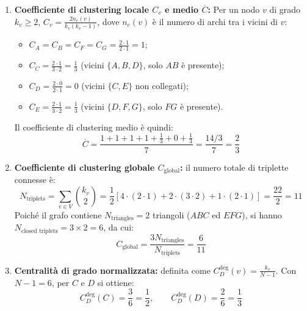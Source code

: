 \begin{enumerate}
    \item \textbf{Coefficiente di clustering locale $C_v$ e medio $\overline{C}$:}
    Per un nodo $v$ di grado $k_v \ge 2$, $C_v = \frac{2 n_e(v)}{k_v(k_v - 1)}$, dove $n_e(v)$ \`e il numero di archi tra i vicini di $v$:
    \begin{itemize}
        \item $C_A = C_B = C_F = C_G = \frac{2 \cdot 1}{2 \cdot 1} = 1$;
        \item $C_C = \frac{2 \cdot 1}{3 \cdot 2} = \frac{1}{3}$ (vicini $\{A,B,D\}$, solo $AB$ \`e presente);
        \item $C_D = \frac{2 \cdot 0}{2 \cdot 1} = 0$ (vicini $\{C,E\}$ non collegati);
        \item $C_E = \frac{2 \cdot 1}{3 \cdot 2} = \frac{1}{3}$ (vicini $\{D,F,G\}$, solo $FG$ \`e presente).
    \end{itemize}
    Il coefficiente di clustering medio \`e quindi:
    \begin{equation*}
        \overline{C} = \frac{1 + 1 + 1 + 1 + \frac{1}{3} + 0 + \frac{1}{3}}{7} = \frac{14/3}{7} = \frac{2}{3}
    \end{equation*}
    \item \textbf{Coefficiente di clustering globale $C_{\text{global}}$:} il numero totale di triplette connesse \`e:
    \begin{equation*}
        N_{\text{triplets}} = \sum_{v \in V} \binom{k_v}{2} = \frac{1}{2}\left[4 \cdot (2 \cdot 1) + 2 \cdot (3 \cdot 2) + 1 \cdot (2 \cdot 1)\right] = \frac{22}{2} = 11
    \end{equation*}
    Poich\'e il grafo contiene $N_{\text{triangles}} = 2$ triangoli ($ABC$ ed $EFG$), si hanno $N_{\text{closed triplets}} = 3 \times 2 = 6$, da cui:
    \begin{equation*}
        C_{\text{global}} = \frac{3 N_{\text{triangles}}}{N_{\text{triplets}}} = \frac{6}{11}
    \end{equation*}
    \item \textbf{Centralit\`a di grado normalizzata:} definita come $C_D^{\text{deg}}(v) = \frac{k_v}{N - 1}$. Con $N - 1 = 6$, per $C$ e $D$ si ottiene:
    \begin{equation*}
        C_D^{\text{deg}}(C) = \frac{3}{6} = \frac{1}{2}, \qquad C_D^{\text{deg}}(D) = \frac{2}{6} = \frac{1}{3}
    \end{equation*}
\end{enumerate}

